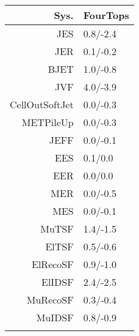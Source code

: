 \begin{tabular}{r|p{.08\linewidth}}
\toprule
 Sys.  & FourTops \\
\toprule
JES  & 0.8/-2.4 \\
JER  & 0.1/-0.2 \\
BJET  & 1.0/-0.8 \\
JVF  & 4.0/-3.9 \\
CellOutSoftJet  & 0.0/-0.3 \\
METPileUp  & 0.0/-0.3 \\
JEFF  & 0.0/-0.1 \\
EES  & 0.1/0.0 \\
EER  & 0.0/0.0 \\
MER  & 0.0/-0.5 \\
MES  & 0.0/-0.1 \\
MuTSF  & 1.4/-1.5 \\
ElTSF  & 0.5/-0.6 \\
ElRecoSF  & 0.9/-1.0 \\
ElIDSF  & 2.4/-2.5 \\
MuRecoSF  & 0.3/-0.4 \\
MuIDSF  & 0.8/-0.9 \\
 \\
\bottomrule
\end{tabular}
